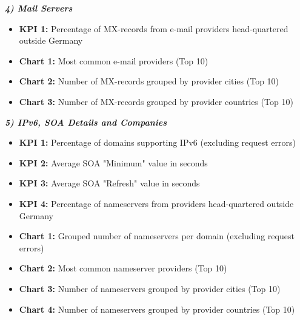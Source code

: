 {\setlength{\parindent}{0cm}\textbf{\textit{4) Mail Servers}}}
\begin{itemize}
    \item \textbf{KPI 1:} Percentage of MX-records from e-mail providers head-quartered outside Germany
    \item \textbf{Chart 1:} Most common e-mail providers (Top 10)
    \item \textbf{Chart 2:} Number of MX-records grouped by provider cities (Top 10)
    \item \textbf{Chart 3:} Number of MX-records grouped by provider countries (Top 10)
\end{itemize}

{\setlength{\parindent}{0cm}\textbf{\textit{5) IPv6, SOA Details and Companies}}}
\begin{itemize}
    \item \textbf{KPI 1:} Percentage of domains supporting IPv6 (excluding request errors)
    \item \textbf{KPI 2:} Average SOA "Minimum" value in seconds
    \item \textbf{KPI 3:} Average SOA "Refresh" value in seconds
    \item \textbf{KPI 4:} Percentage of nameservers from providers head-quartered outside Germany
    \item \textbf{Chart 1:} Grouped number of nameservers per domain (excluding request errors)
    \item \textbf{Chart 2:} Most common nameserver providers (Top 10)
    \item \textbf{Chart 3:} Number of nameservers grouped by provider cities (Top 10)
    \item \textbf{Chart 4:} Number of nameservers grouped by provider countries (Top 10)
\end{itemize}
